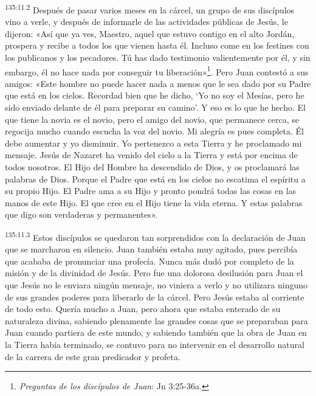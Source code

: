 \par
\textsuperscript{135:11.2} Después de pasar varios meses en la cárcel, un grupo de sus discípulos vino a verle, y después de informarle de las actividades públicas de Jesús, le dijeron: «Así que ya ves, Maestro, aquel que estuvo contigo en el alto Jordán, prospera y recibe a todos los que vienen hasta él. Incluso come en los festines con los publicanos y los pecadores. Tú has dado testimonio valientemente por él, y sin embargo, él no hace nada por conseguir tu liberación»\footnote{\textit{Preguntas de los discípulos de Juan}: Jn 3:25-36a.}. Pero Juan contestó a sus amigos: «Este hombre no puede hacer nada a menos que le sea dado por su Padre que está en los cielos. Recordad bien que he dicho, `Yo no soy el Mesías, pero he sido enviado delante de él para preparar su camino'. Y eso es lo que he hecho. El que tiene la novia es el novio, pero el amigo del novio, que permanece cerca, se regocija mucho cuando escucha la voz del novio. Mi alegría es pues completa. Él debe aumentar y yo disminuir. Yo pertenezco a esta Tierra y he proclamado mi mensaje. Jesús de Nazaret ha venido del cielo a la Tierra y está por encima de todos nosotros. El Hijo del Hombre ha descendido de Dios, y os proclamará las palabras de Dios. Porque el Padre que está en los cielos no escatima el espíritu a su propio Hijo. El Padre ama a su Hijo y pronto pondrá todas las cosas en las manos de este Hijo. El que cree en el Hijo tiene la vida eterna. Y estas palabras que digo son verdaderas y permanentes».

\par
\textsuperscript{135:11.3} Estos discípulos se quedaron tan sorprendidos con la declaración de Juan que se marcharon en silencio. Juan también estaba muy agitado, pues percibía que acababa de pronunciar una profecía. Nunca más dudó por completo de la misión y de la divinidad de Jesús. Pero fue una dolorosa desilusión para Juan el que Jesús no le enviara ningún mensaje, no viniera a verlo y no utilizara ninguno de sus grandes poderes para liberarlo de la cárcel. Pero Jesús estaba al corriente de todo esto. Quería mucho a Juan, pero ahora que estaba enterado de su naturaleza divina, sabiendo plenamente las grandes cosas que se preparaban para Juan cuando partiera de este mundo, y sabiendo también que la obra de Juan en la Tierra había terminado, se contuvo para no intervenir en el desarrollo natural de la carrera de este gran predicador y profeta.

